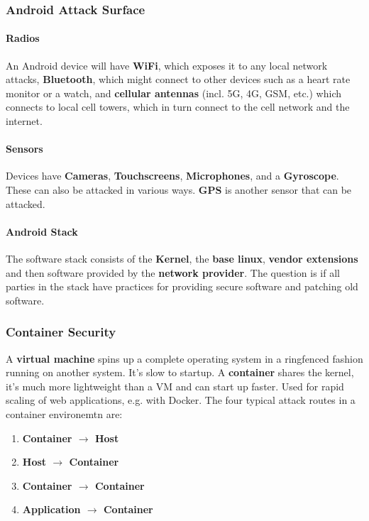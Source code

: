 \subsubsection{Android Attack Surface}

\paragraph{Radios} An Android device will have \textbf{WiFi}, which exposes it to any local network attacks, \textbf{Bluetooth}, which might connect to other devices such as a heart rate monitor or a watch, and \textbf{cellular antennas} (incl. 5G, 4G, GSM, etc.) which connects to local cell towers, which in turn connect to the cell network and the internet.

\paragraph{Sensors} Devices have \textbf{Cameras}, \textbf{Touchscreens}, \textbf{Microphones}, and a \textbf{Gyroscope}. These can also be attacked in various ways. \textbf{GPS} is another sensor that can be attacked.

\paragraph{Android Stack} The software stack consists of the \textbf{Kernel}, the \textbf{base linux}, \textbf{vendor extensions} and then software provided by the \textbf{network provider}. The question is if all parties in the stack have practices for providing secure software and patching old software.


\subsubsection{Container Security}

A \textbf{virtual machine} spins up a complete operating system in a ringfenced fashion running on another system. It's slow to startup. A \textbf{container} shares the kernel, it's much more lightweight than a VM and can start up faster. Used for rapid scaling of web applications, e.g. with Docker. The four typical attack routes in a container environemtn are:

\begin{enumerate}
    \item \textbf{Container $\rightarrow$ Host}
    \item \textbf{Host $\rightarrow$ Container}
    \item \textbf{Container $\rightarrow$ Container}
    \item \textbf{Application $\rightarrow$ Container}
\end{enumerate}


